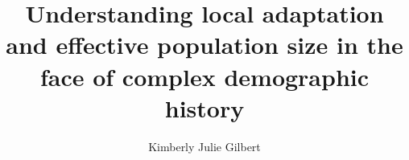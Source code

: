 \documentclass[
12pt         %
,oneside
,openright   %
]{mythesis}
\title{Understanding local adaptation and effective population size in the face of complex demographic history}
\author{Kimberly Julie Gilbert}
\begin{document}
\maketitle


%




  



\allcontents


\cleardoublepage
\mainbody








\formatbibliography



\formatappendices

\end{document}
